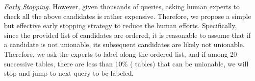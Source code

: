 

\noindent  \underline{\textit{Early Stopping.}} 
However, given thousands of queries, asking human experts to check all the above candidates is rather expensive. 
%
Therefore, we propose a simple but effective early stopping strategy to reduce the human efforts. Specifically, since the provided list of candidates are ordered, it is reasonable to assume that if a candidate is not unionable, its subsequent candidates are likely not unionable. Therefore, we ask the experts to label along the ordered list, and if among 20 successive tables, there are less than 10\% ( tables) that can be unionable, we will stop and jump to next query to be labeled.



%





